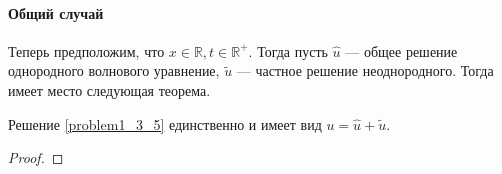 \paragraph{Общий случай}

Теперь предположим, что $x \in \mathbb{R}, t \in \mathbb{R}^+$. Тогда пусть $\hat{u}$ --- общее решение однородного волнового уравнение, $\tilde{u}$ --- частное решение неоднородного. Тогда имеет место следующая теорема.

\begin{thm}
  Решение \eqref{problem1_3_5} единственно и имеет вид $u = \hat{u} + \tilde{u}$.
\end{thm}

\begin{proof}
\end{proof}